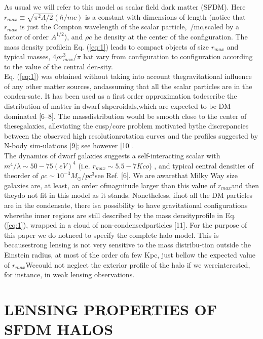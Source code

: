 \documentclass[10pt]{article}
\begin{document}
\begin{multicols}{2}
As usual we will refer to this model as scalar field dark matter (SFDM). Here \(r_{max}\equiv\sqrt{\pi^{2}\Lambda/2}(\hbar/mc)\) is a constant with dimensions of length (notice that \(r_{max}\) is just the  Compton  wavelength  of  the  scalar  particle,~/mc,scaled by a factor of order \(A^{1/2}\)), and \(\rho c\) he density at the center of the configuration.  The mass density profilein Eq. (\ref{eq:1}) leads to compact objects of size \(r_{max}\) and typical masses, \(4\rho r^{3}_{max}/\pi\) hat vary from configuration to configuration according to the value of the central den-sity.\\
Eq. (\ref{eq:1}) was obtained without taking into account thegravitational influence of any other matter sources, andassuming that all the scalar particles are in the conden-sate.  It has been used as a first order approximation todescribe the distribution of matter in dwarf shperoidals,which are expected to be DM dominated [6–8].  The massdistribution would be smooth close to the center of thesegalaxies, alleviating the cusp/core problem motivated bythe  discrepancies  between  the  observed  high  resolutionrotation curves and the profiles suggested by N-body sim-ulations [9]; see however [10].\\

The   dynamics   of   dwarf   galaxies   suggests   a   self-interacting  scalar  with \(m^{4}/\lambda\sim50-75(eV)^{4}\) (i.e. \( r_{max}\sim5.5-7Kco\)) , and typical central densities of theorder of \(\rho c\sim10^{-3}M_{\odot}/pc^{3}\)see Ref. [6].  We are awarethat  Milky  Way  size  galaxies  are,  at  least,  an  order  ofmagnitude larger than this value of \(r_{max}\)and then theydo  not  fit  in  this  model  as  it  stands.   Nonetheless,  ifnot all the DM particles are in the condensate, there isa  possibility  to  have  gravitational  configurations  wherethe inner regions are still described by the mass densityprofile in Eq.  (\ref{eq:1}), wrapped in a cloud of non-condensedparticles [11].  For the purpose of this paper we do notneed to specify the complete halo model.  This is becausestrong lensing is not very sensitive to the mass distribu-tion outside the Einstein radius, at most of the order ofa few Kpc, just bellow the expected value of \(r_{max}\)Wecould not neglect the exterior profile of the halo if we wereinterested, for instance, in weak lensing observations.

\section{\large \centering LENSING PROPERTIES OF SFDM HALOS}\\


\end{multicols}
\end{document}

